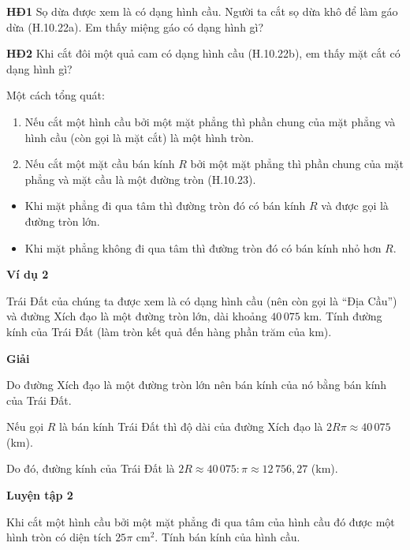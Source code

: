 \begin{lesson}
    \textbf{HĐ1} Sọ dừa được xem là có dạng hình cầu. Người ta cắt sọ dừa khô để làm gáo dừa (H.10.22a). Em thấy miệng gáo có dạng hình gì?

    \answerline

    \textbf{HĐ2} Khi cắt đôi một quả cam có dạng hình cầu (H.10.22b), em thấy mặt cắt có dạng hình gì?

    \answerline


    Một cách tổng quát:
    \begin{enumerate}[label=\arabic*.]
        \item Nếu cắt một hình cầu bởi một mặt phẳng thì phần chung của mặt phẳng và hình cầu (còn gọi là mặt cắt) là một hình tròn.
        \item Nếu cắt một mặt cầu bán kính $R$ bởi một mặt phẳng thì phần chung của mặt phẳng và mặt cầu là một đường tròn (H.10.23).
    \end{enumerate}


    \begin{itemize}
        \item Khi mặt phẳng đi qua tâm thì đường tròn đó có bán kính $R$ và được gọi là đường tròn lớn.
        \item Khi mặt phẳng không đi qua tâm thì đường tròn đó có bán kính nhỏ hơn $R$.
    \end{itemize}

    \textbf{Ví dụ 2}

    Trái Đất của chúng ta được xem là có dạng hình cầu (nên còn gọi là ``Địa Cầu'') và đường Xích đạo là một đường tròn lớn, dài khoảng $40\,075$ km. Tính đường kính của Trái Đất (làm tròn kết quả đến hàng phần trăm của km).

    \textbf{Giải}

    Do đường Xích đạo là một đường tròn lớn nên bán kính của nó bằng bán kính của Trái Đất.

    Nếu gọi $R$ là bán kính Trái Đất thì độ dài của đường Xích đạo là $2R\pi\approx 40\,075$ (km).

    Do đó, đường kính của Trái Đất là $2R\approx 40\,075:\pi\approx 12\,756{,}27$ (km).

    \textbf{Luyện tập 2}

    Khi cắt một hình cầu bởi một mặt phẳng đi qua tâm của hình cầu đó được một hình tròn có diện tích $25\pi$ cm$^2$. Tính bán kính của hình cầu.


\end{lesson}
